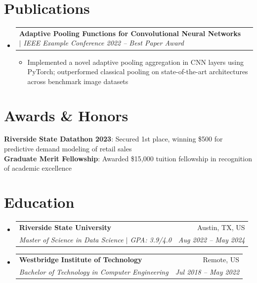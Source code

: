 \documentclass[letterpaper,11pt]{article}
\makeatletter
\newcommand{\resumeItem}[1]{
  \item\small{
    {#1 \vspace{-3pt}}
  }
}
\newcommand{\resumeSubheading}[4]{
  \vspace{-2pt}\item
    \begin{tabular*}{0.97\textwidth}[t]{l@{\extracolsep{\fill}}r}
      \textbf{#1} & #2 \\
      \textit{\small#3} & \textit{\small #4} \\
    \end{tabular*}\vspace{-9pt}
}
\newcommand{\resumeProjectHeading}[2]{
    \item
    \begin{tabular*}{0.97\textwidth}{l@{\extracolsep{\fill}}r}
      \small#1 & #2 \\
    \end{tabular*}\vspace{-7pt}
}
\newcommand{\resumeSubHeadingListStart}{\begin{itemize}[leftmargin=0.15in, label={}]}
\newcommand{\resumeSubHeadingListEnd}{\end{itemize}}
\newcommand{\resumeItemListStart}{\begin{itemize}}
\newcommand{\resumeItemListEnd}{\end{itemize}\vspace{-7pt}}
\makeatother
\begin{document}
\section{Publications}
    \resumeSubHeadingListStart
      \resumeProjectHeading
          {\textbf{Adaptive Pooling Functions for Convolutional Neural Networks} $|$ \emph{IEEE Example Conference 2022 -- Best Paper Award}}{}
          \resumeItemListStart
            \resumeItem{Implemented a novel adaptive pooling aggregation in CNN layers using PyTorch; outperformed classical pooling on state-of-the-art architectures across benchmark image datasets}
          \resumeItemListEnd
    \resumeSubHeadingListEnd

\section{Awards \& Honors}
 \begin{itemize}[leftmargin=0.15in, label={}]
    \small{\item{
     \textbf{Riverside State Datathon 2023}{: Secured 1st place, winning \$500 for predictive demand modeling of retail sales} \\
     \textbf{Graduate Merit Fellowship}{: Awarded \$15,000 tuition fellowship in recognition of academic excellence}
    }}
 \end{itemize}

\section{Education}
  \resumeSubHeadingListStart
    \resumeSubheading
      {Riverside State University}{Austin, TX, US}
      {Master of Science in Data Science $|$ GPA: 3.9/4.0}{Aug 2022 -- May 2024}
    \resumeSubheading
      {Westbridge Institute of Technology}{Remote, US}
      {Bachelor of Technology in Computer Engineering}{Jul 2018 -- May 2022}
  \resumeSubHeadingListEnd

\end{document}
